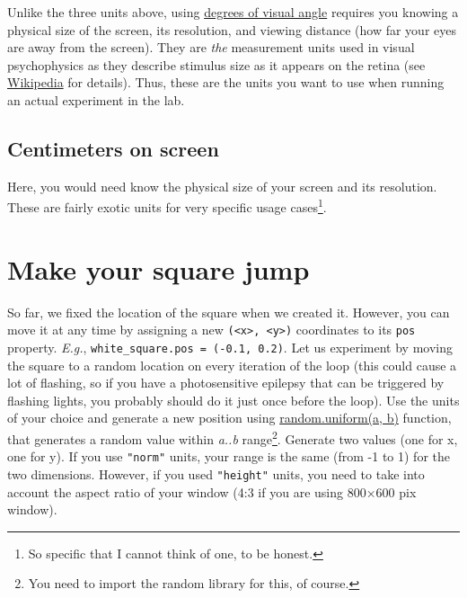 \documentclass[
]{book}
\begin{document}
Unlike the three units above, using \href{https://psychopy.org/general/units.html\#degrees-of-visual-angle}{degrees of visual angle} requires you knowing a physical size of the screen, its resolution, and viewing distance (how far your eyes are away from the screen). They are \emph{the} measurement units used in visual psychophysics as they describe stimulus size as it appears on the retina (see \href{https://en.wikipedia.org/wiki/Visual_angle}{Wikipedia} for details). Thus, these are the units you want to use when running an actual experiment in the lab.

\hypertarget{centimeters-on-screen}{%
\subsection{Centimeters on screen}\label{centimeters-on-screen}}

Here, you would need know the physical size of your screen and its resolution. These are fairly exotic units for very specific usage cases\footnote{So specific that I cannot think of one, to be honest.}.

\hypertarget{make-your-square-jump}{%
\section{Make your square jump}\label{make-your-square-jump}}

So far, we fixed the location of the square when we created it. However, you can move it at any time by assigning a new \texttt{(\textless{}x\textgreater{},\ \textless{}y\textgreater{})} coordinates to its \texttt{pos} property. \emph{E.g.}, \texttt{white\_square.pos\ =\ (-0.1,\ 0.2)}. Let us experiment by moving the square to a random location on every iteration of the loop (this could cause a lot of flashing, so if you have a photosensitive epilepsy that can be triggered by flashing lights, you probably should do it just once before the loop). Use the units of your choice and generate a new position using \href{https://docs.python.org/3/library/random.html\#random.uniform}{random.uniform(a, b)} function, that generates a random value within \emph{a..b} range\footnote{You need to import the random library for this, of course.}. Generate two values (one for x, one for y). If you use \texttt{"norm"} units, your range is the same (from -1 to 1) for the two dimensions. However, if you used \texttt{"height"} units, you need to take into account the aspect ratio of your window (4:3 if you are using 800×600 pix window).
\end{document}
